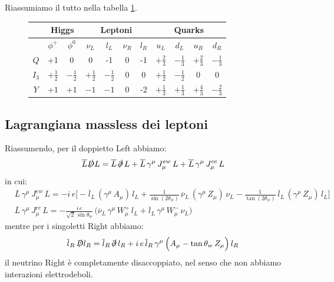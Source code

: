Riassumiamo il tutto nella tabella \ref{tab:5 riassunto numeri quantici SM}.
\begin{figure}[ht!]
    \centering
\begin{tabular}{|c|c|c|c|c|c|c|c|c|c|c|}
        \hline
        \rule{0pt}{3ex}
         & \multicolumn{2}{|c|}{Higgs} & \multicolumn{4}{|c|}{Leptoni} & \multicolumn{4}{|c|}{Quarks} \\[1ex]
        \hline
        \rule{0pt}{3ex}
         & $\phi^+$ & $\phi^0$ & $\nu_L$ & $l_L$ & $\nu_R$ & $l_R$ & $u_L$ & $d_L$ & $u_R$ & $d_R$ \\[1ex]
        \hline
        \rule{0pt}{3ex}
        $Q$ & +1 & 0 & 0 & -1 & 0 & -1 & $+\frac{2}{3}$ & $-\frac{1}{3}$ & $+\frac{2}{3}$ & $-\frac{1}{3}$ \\[1ex]
        \hline
        \rule{0pt}{3ex}
        $I_3$ & $+\frac{1}{2}$ & $-\frac{1}{2}$ & $+\frac{1}{2}$ & $-\frac{1}{2}$ & 0 & 0 & $+\frac{1}{2}$ & $-\frac{1}{2}$ & 0 & 0 \\[1ex]
        \hline
        \rule{0pt}{3ex}
        $Y$ & $+1$ & $+1$ & $-1$ & $-1$ & 0 & -2 & $+\frac{1}{3}$ & $+\frac{1}{3}$ & $+\frac{4}{3}$ & $-\frac{2}{3}$ \\[1ex]
        \hline
    \end{tabular}
    \caption{}
    \label{tab:5 riassunto numeri quantici SM}
\end{figure}


\subsection{Lagrangiana massless dei leptoni}

Riassumendo, per il doppietto Left abbiamo:
\begin{equation}
    \overline{L}\slashed{D} L = \overline{L}\, \slashed{\partial}\, L + \overline{L}\, \gamma^\mu\, J_\mu^{ew}\, L + \overline{L}\, \gamma^\mu\, J_{\mu}^{cc}\, L
\end{equation}
in cui:
\begin{align}
    &\overline{L}\, \gamma^\mu\, J_\mu^{ew}\, L = -i\, e\Bigg[ -\overline{l}_L\, (\gamma^\mu\, A_\mu)\, l_L + \frac{1}{\sin{(2\theta_w)}}\, \overline{\nu}_L\, (\gamma^\mu\, Z_\mu)\, \nu_L - \frac{1}{\tan{(2\theta_w)}}\, \overline{l}_L\, (\gamma^\mu\, Z_\mu)\, l_L \Bigg] \\
    &\overline{L}\, \gamma^\mu\, J_\mu^{cc}\, L = -\frac{i\, e}{\sqrt{2}\, \sin\theta_w}\, \Big( \overline{\nu}_L\, \gamma^\mu\, W_\mu^+\, l_L + \overline{l}_L\, \gamma^\mu\, W_\mu^-\, \nu_L \Big)
\end{align}
mentre per i singoletti Right abbiamo:
\begin{equation}
    \overline{l}_R\, \slashed{D} l_R = \overline{l}_R\, \slashed{\partial}\, l_R + i\, e\, \overline{l}_R\, \gamma^\mu\, \Big( A_\mu - \tan\theta_w\, Z_\mu \Big)\, l_R
\end{equation}
il neutrino Right è completamente disaccoppiato, nel senso che non abbiamo interazioni elettrodeboli.

